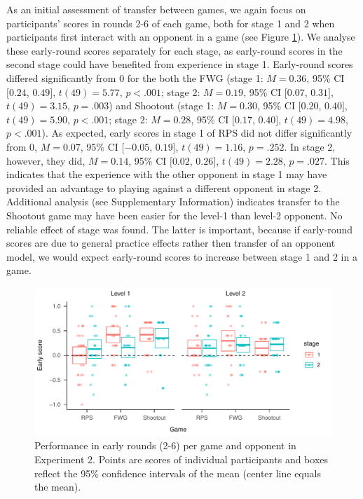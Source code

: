 \documentclass[smallextended]{svjour3}       %
\begin{document}
As an initial assessment of transfer between games, we again focus on
participants' scores in rounds 2-6 of each game, both for stage 1 and 2
when participants first interact with an opponent in a game (see Figure
\ref{fig:exp2-early-score-by-opp}). We analyse these early-round scores
separately for each stage, as early-round scores in the second stage
could have benefited from experience in stage 1. Early-round scores
differed significantly from 0 for the both the FWG (stage 1:
\(M = 0.36\), 95\% CI \([0.24\), \(0.49]\), \(t(49) = 5.77\),
\(p < .001\); stage 2: \(M = 0.19\), 95\% CI \([0.07\), \(0.31]\),
\(t(49) = 3.15\), \(p = .003\)) and Shootout (stage 1: \(M = 0.30\),
95\% CI \([0.20\), \(0.40]\), \(t(49) = 5.90\), \(p < .001\); stage 2:
\(M = 0.28\), 95\% CI \([0.17\), \(0.40]\), \(t(49) = 4.98\),
\(p < .001\)). As expected, early scores in stage 1 of RPS did not
differ significantly from 0, \(M = 0.07\), 95\% CI \([-0.05\),
\(0.19]\), \(t(49) = 1.16\), \(p = .252\). In stage 2, however, they
did, \(M = 0.14\), 95\% CI \([0.02\), \(0.26]\), \(t(49) = 2.28\),
\(p = .027\). This indicates that the experience with the other opponent
in stage 1 may have provided an advantage to playing against a different
opponent in stage 2. Additional analysis (see Supplementary Information)
indicates transfer to the Shootout game may have been easier for the
level-1 than level-2 opponent. No reliable effect of stage was found.
The latter is important, because if early-round scores are due to
general practice effects rather then transfer of an opponent model, we
would expect early-round scores to increase between stage 1 and 2 in a
game.

\begin{figure}

{\centering \includegraphics[width=\textwidth]{CBB_v2_files/figure-latex/exp2-early-score-by-opp-1} 

}

\caption{\label{ref:figure4-caption}Performance in early rounds (2-6) per game and opponent in Experiment 2. Points are scores of individual participants and boxes reflect the 95\% confidence intervals of the mean (center line equals the mean).}\label{fig:exp2-early-score-by-opp}
\end{figure}
\end{document}
